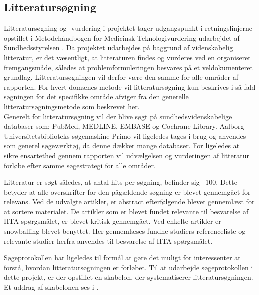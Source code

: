 \subsection{Litteratursøgning} \label{sec_lit}
Litteratursøgning og -vurdering i projektet tager udgangspunkt i retningslinjerne opstillet i Metodehåndbogen for Medicinsk Teknologivurdering udarbejdet af Sundhedsstyrelsen \citep{metodehaandbogen}. Da projektet udarbejdes på baggrund af videnskabelig litteratur, er det væsentligt, at litteraturen findes og vurderes ved en organiseret fremgangsmåde, således at problemformuleringen besvares på et veldokumenteret grundlag. Litteratursøgningen vil derfor være den samme for alle områder af rapporten. For hvert domænes metode vil litteratursøgning kun beskrives i så fald søgningen for det specifikke område afviger fra den generelle litteratursøgningsmetode som beskrevet her. \\
Generelt for litteratursøgning vil der blive søgt på sundhedsvidenskabelige databaser som: PubMed, MEDLINE, EMBASE og Cochrane Library. Aalborg Universitetsbiblioteks søgemaskine Primo vil ligeledes tages i brug og anvendes som generel søgeværktøj, da denne dækker mange databaser. For ligeledes at sikre ensartethed gennem rapporten vil udvælgelsen og vurderingen af litteratur forløbe efter samme søgestrategi for alle områder. 

Litteratur er søgt således, at antal hits per søgning, befinder sig ~100. Dette betyder at alle overskrifter for den pågældende søgning er blevet gennemgået for relevans. Ved de udvalgte artikler, er abstract efterfølgende blevet gennemlæst for at sortere materialet. De artikler som er blevet fundet relevante til besvarelse af HTA-spørgsmålet, er blevet kritisk gennemgået. Ved enkelte artikler er snowballing blevet benyttet. Her gennemlæses fundne studiers referenceliste og relevante studier herfra anvendes til besvarelse af HTA-spørgsmålet.

Søgeprotokollen har ligeledes til formål at gøre det muligt for interessenter at forstå, hvordan litteratursøgningen er forløbet. \citep{metodehaandbogen} Til at udarbejde søgeprotokollen i dette projekt, er der opstillet en skabelon, der systematiserer litteratursøgningen. Et uddrag af skabelonen ses i .

